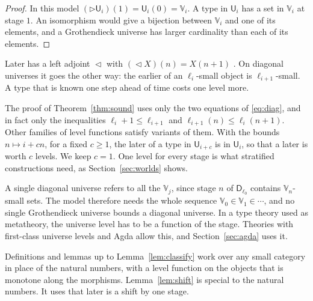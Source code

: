 \documentclass[acmsmall,nonacm,screen]{acmart}
\newcommand{\later}{{\triangleright}}
\newcommand{\Uv}{\mathsf{U}}
\newcommand{\Vg}{\mathbb{V}}
\newcommand{\Dg}{\mathsf{D}}
\begin{document}
\begin{proof}
In this model $(\later\Uv_i)(1) = \Uv_i(0) = \Vg_i$. A type in $\Uv_i$ has a set in $\Vg_i$
at stage $1$. An isomorphism would give a bijection between $\Vg_i$ and one of its
elements, and a Grothendieck universe has larger cardinality than each of its elements.
\end{proof}

\begin{remark}
Later has a left adjoint $\vartriangleleft$ with $({\vartriangleleft}X)(n) = X(n+1)$
\citep{BMSS2012}. On diagonal universes it goes the other way: the earlier of an
$\ell_i$-small object is $\ell_{i+1}$-small. A type that is known one step ahead of time
costs one level more.
\end{remark}

\begin{remark}\label{rem:rates}
The proof of Theorem~\ref{thm:sound} uses only the two equations of \eqref{eq:diag}, and in
fact only the inequalities $\ell_i + 1 \le \ell_{i+1}$ and $\ell_{i+1}(n) \le \ell_i(n+1)$.
Other families of level functions satisfy variants of them. With the bounds
$n \mapsto i + cn$, for a fixed $c \ge 1$, the later of a type in $\Uv_{i+c}$ is in $\Uv_i$,
so that a later is worth $c$ levels. We keep $c = 1$. One level for every stage is what
stratified constructions need, as Section~\ref{sec:worlds} shows.
\end{remark}

\begin{remark}\label{rem:meta}
A single diagonal universe refers to all the $\Vg_j$, since stage $n$ of $\Dg_{\ell_0}$
contains $\Vg_n$-small sets. The model therefore needs the whole sequence
$\Vg_0 \in \Vg_1 \in \cdots$, and no single Grothendieck universe bounds a diagonal universe.
In a type theory used as metatheory, the universe level has to be a function of the stage.
Theories with first-class universe levels \citep{Kovacs2022} and Agda \citep{AgdaManual}
allow this, and Section~\ref{sec:agda} uses it.
\end{remark}

\begin{remark}
Definitions and lemmas up to Lemma~\ref{lem:classify} work over any small category in
place of the natural numbers, with a level function on the objects that is monotone along
the morphisms. Lemma~\ref{lem:shift} is special to the natural numbers. It uses that later
is a shift by one stage.
\end{remark}
\end{document}
